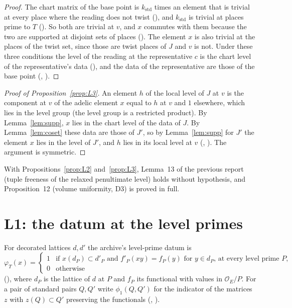 \documentclass[11pt]{article}
\newcommand{\OEr}{\mathcal O_E}
\theoremstyle{definition}
\theoremstyle{remark}
\begin{document}
\begin{proof}
The chart matrix of the base point is $k_{\mathrm{std}}$ times an element that is trivial at every place where the reading does not twist (), and $k_{\mathrm{std}}$ is trivial at places prime to $T$ (). So both are trivial at $v$, and $x$ commutes with them because the two are supported at disjoint sets of places (). The element $x$ is also trivial at the places of the twist set, since those are twist places of $J$ and $v$ is not. Under these three conditions the level of the reading at the representative $c$ is the chart level of the representative's  data (), and the  data of the representative are those of the base point (, ).
\end{proof}

\begin{proof}[Proof of Proposition~\ref{prop:L3}]
An element $h$ of the local level of $J$ at $v$ is the component at $v$ of the adelic element $x$ equal to $h$ at $v$ and $1$ elsewhere, which lies in the level group (the level group is a restricted product). By Lemma~\ref{lem:supp}, $x$ lies in the chart level of the  data of $J$. By Lemma~\ref{lem:coset} these  data are those of $J'$, so by Lemma~\ref{lem:supp} for $J'$ the element $x$ lies in the level of $J'$, and $h$ lies in its local level at $v$ (, ). The argument is symmetric.
\end{proof}

With Propositions~\ref{prop:L2} and~\ref{prop:L3}, Lemma~13 of the previous report (tuple freeness of the relaxed penultimate level) holds without hypothesis, and Proposition~12 (volume uniformity, D3) is proved in full.

\section{L1: the datum at the level primes}\label{sec:L1}

For decorated lattices $d,d'$ the archive's level-prime datum is
\[
\varphi_T(x)=\begin{cases}1&\text{if } x(d_P)\subset d'_P \text{ and } f'_P(xy)=f_P(y)\text{ for } y\in d_P \text{, at every level prime } P,\\ 0&\text{otherwise}\end{cases}
\]
(), where $d_P$ is the lattice of $d$ at $P$ and $f_P$ its functional with values in $\OEr/P$. For a pair of standard pairs $Q,Q'$ write $\phi_1(Q,Q')$ for the indicator of the matrices $z$ with $z(Q)\subset Q'$ preserving the functionals (, ).
\end{document}
